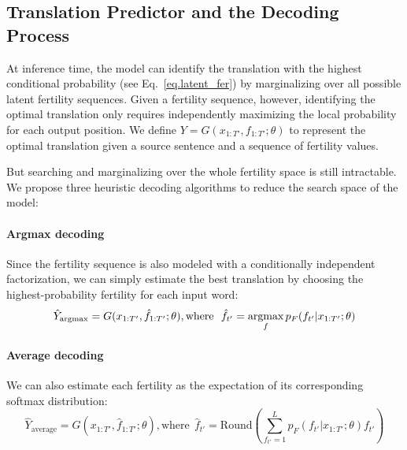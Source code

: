\subsection{Translation Predictor and the Decoding Process}
At inference time, the model can identify the translation with the highest conditional probability (see Eq.~\ref{eq.latent_fer}) by marginalizing over all possible latent fertility sequences. 
Given a fertility sequence, however, identifying the optimal translation only requires independently maximizing the local probability for each output position.
We define $Y = G(x_{1:T'}, f_{1:T'}; \theta)$ to represent the optimal translation given a source sentence and a sequence of fertility values.

But searching and marginalizing over the whole fertility space is still intractable. We propose three heuristic decoding algorithms to reduce the search space of the \model{} model:

\vspace{-5pt}
\paragraph{Argmax decoding} Since the fertility sequence is also modeled with a conditionally independent factorization, we can simply estimate the best translation by choosing the highest-probability fertility for each input word:
\begin{equation}
	\hat{Y}_\text{argmax} = G(x_{1:T'}, \hat{f}_{1:T'};\theta), \textrm{where} \ \ \hat{f}_{t'}=\mathop{\text{argmax}}_f p_F(f_{t'}|x_{1:T'};\theta)
\end{equation}

\vspace{-5pt}
\paragraph{Average decoding}
We can also estimate each fertility as the expectation of its corresponding softmax distribution:
\begin{equation}
	\hat{Y}_\text{average} = G(x_{1:T'}, \hat{f}_{1:T'};\theta), \textrm{where} \ \ \hat{f}_{t'}=\textrm{Round}\left(\sum_{f_{t'}=1}^L p_F(f_{t'}|x_{1:T'};\theta)f_{t'}\right)
    \label{eq.average}
\end{equation}

